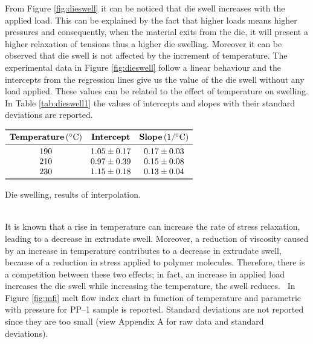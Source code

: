 \documentclass[a4paper, 11pt]{article}
\begin{document}
From Figure \ref{fig:dieswell} it can be noticed that die swell increases with the applied load. This can be explained by the fact that higher loads means higher pressures and consequently, when the material exits from the die, it will present a higher relaxation of tensions thus a higher die swelling. Moreover it can be observed that die swell is not affected by the increment of temperature. The experimental data in Figure \ref{fig:dieswell} follow a linear behaviour and the intercepts from the regression lines give us the value of the die swell without any load applied. These values can be related to the effect of temperature on swelling.
In Table \ref{tab:dieswell1} the values of intercepts and slopes with their standard deviations are reported.
\begin{table}[htp]
	\centering
	$
	\begin{array}{ccc}
	\toprule
	\textbf{Temperature}\, (^\circ \text{C}) & \textbf{Intercept} & \textbf{Slope} \, (1/^\circ \text{C}) \\
	\midrule
	190 & 1.05 \pm 0.17 & 0.17 \pm 0.03 \\
	210 & 0.97 \pm 0.39 & 0.15 \pm 0.08 \\
	230 & 1.15 \pm 0.18 & 0.13 \pm 0.04 \\
	\bottomrule
	\end{array}
	$
	\caption{Die swelling, results of interpolation.}
	\label{tab:dieswell1}
\end{table}\\
It is known that a rise in temperature can increase the rate of stress relaxation, leading to a decrease in extrudate swell. Moreover, a reduction of viscosity caused by an increase in temperature contributes to a decrease in extrudate swell, because of a reduction in stress applied to polymer molecules.
Therefore, there is a competition between these two effects; in fact, an increase in applied load increases the die swell while increasing the temperature, the swell reduces.~\cite{swell}
\newpage
In Figure \ref{fig:mfi} melt flow index chart in function of temperature and parametric with pressure for PP–1 sample is reported. Standard deviations are not reported since they are too small (view Appendix A for raw data and standard deviations).
\end{document}
